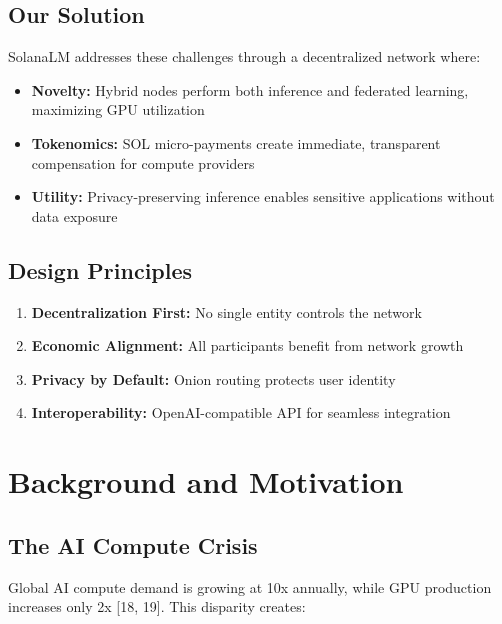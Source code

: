 \documentclass[11pt,a4paper]{article}
\begin{document}
\subsection{Our Solution}

SolanaLM addresses these challenges through a decentralized network where:

\begin{itemize}
    \item \textbf{Novelty:} Hybrid nodes perform both inference and federated learning, maximizing GPU utilization
    \item \textbf{Tokenomics:} SOL micro-payments create immediate, transparent compensation for compute providers
    \item \textbf{Utility:} Privacy-preserving inference enables sensitive applications without data exposure
\end{itemize}

\subsection{Design Principles}

\begin{enumerate}
    \item \textbf{Decentralization First:} No single entity controls the network
    \item \textbf{Economic Alignment:} All participants benefit from network growth
    \item \textbf{Privacy by Default:} Onion routing protects user identity
    \item \textbf{Interoperability:} OpenAI-compatible API for seamless integration
\end{enumerate}

\section{Background and Motivation}

\subsection{The AI Compute Crisis}

Global AI compute demand is growing at 10x annually, while GPU production increases only 2x [18, 19]. This disparity creates:
\end{document}
